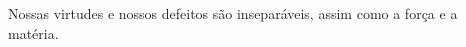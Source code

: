 \inicioepigrafe 

\aasp Nossas virtudes e nossos defeitos são inseparáveis, assim como a força e a matéria.\fasp

